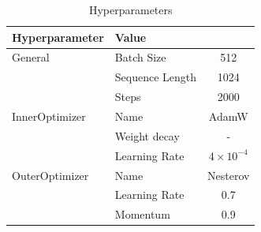 \documentclass{article}
\begin{document}
\begin{table}[h]
\centering
\begin{tabular}{llc}
\toprule
\textbf{Hyperparameter} & \textbf{Value} \\ 
\midrule
\multirow{1}{*}{General} & Batch Size & 512 \\ 
& Sequence Length & 1024 \\ 
& Steps & 2000 \\
\hline
\multirow{1}{*}{InnerOptimizer} & Name & AdamW \\ 
& Weight decay & - \\ 
& Learning Rate & $4 \times 10^{-4}$ \\ 
\hline
\multirow{1}{*}{OuterOptimizer} & Name & Nesterov \\ 
& Learning Rate & 0.7 \\ 
& Momentum & 0.9 \\ 
\bottomrule
\end{tabular}
\caption{Hyperparameters}
\label{tab:hyperparameters}
\end{table}
\end{document}
